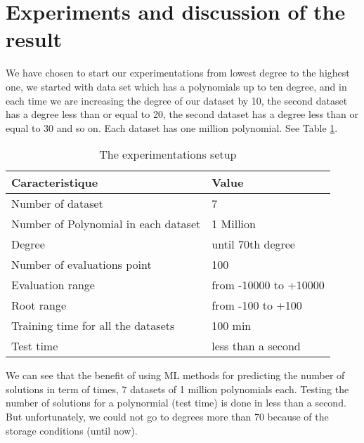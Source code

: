 \documentclass[a4paper,UKenglish]{lipics-v2016}
\begin{document}
 \section{Experiments and discussion of the result \label{section4}}

 We have chosen to start our experimentations from lowest degree to the highest one, we started with data set which has a polynomials up to ten degree, and in each time we are increasing the degree of our dataset by 10, the second dataset has a degree less than or equal to 20, the second dataset has a degree less than or equal to 30 and so on. Each dataset has one million polynomial. See Table \ref{table:characteristics7}.

 \begin{table}
 \caption{The experimentations setup}
 \small
 \begin{center}
 \setlength{\tabcolsep}{0.8em}
 \renewcommand{\arraystretch}{1.5}
 \begin{tabular}{|p{3cm}|p{2.5cm}|}
 \hline

 {Caracteristique  }& {Value}\\
 \hline
 Number of dataset &  7 \\
 \hline
 Number of Polynomial in each dataset&  1 Million\\
 \hline
 Degree& until 70th degree\\
 \hline
 Number of evaluations point & 100  \\
 \hline
 Evaluation range& from -10000 to +10000 \\
 \hline
 Root range& from -100 to +100 \\
 \hline
 Training time for all the datasets & 100 min \\
 \hline
 Test time & less than a second\\
 \hline
 \end{tabular}
 \end{center}
 \label{table:characteristics7}
 \vspace{-5mm}
 \end{table}
 We can see that the benefit of using ML methods for predicting the number of solutions in term of times, 7 datasets of 1 million polynomials each. Testing the number of solutions for a polynormial (test time) is done in less than a second. But unfortunately, we could not go to degrees more than 70 because of the storage conditions (until now).
\end{document}
